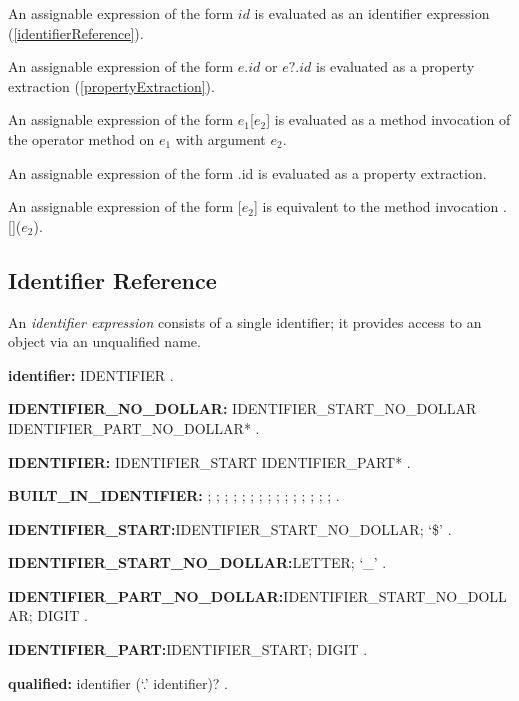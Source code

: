 \documentclass{article}
\newcommand{\code}[1]{{\sf #1}}
\begin{document}
\LMHash{}
An assignable expression of the form $id$ is evaluated as an identifier expression (\ref{identifierReference}).


\LMHash{}
An assignable expression of the form $e.id$ or $e?.id$ is evaluated as a property extraction  (\ref{propertyExtraction}).

\LMHash{}
An assignable expression of the form \code{$e_1$[$e_2$]} is evaluated as a method invocation of the operator method \code{[]} on $e_1$ with argument $e_2$.

\LMHash{}
An assignable expression of the form \code{\SUPER{}.id}  is evaluated as a property extraction.

\LMHash{}
An assignable expression of the form \code{\SUPER{}[$e_2$]} is equivalent to the method invocation  \code{\SUPER{}.[]($e_2$)}.

\subsection{ Identifier Reference}

\LMHash{}
An {\em identifier expression} consists of a single identifier; it provides access to an object via an unqualified name.

\begin{grammar}
{\bf identifier:}
     IDENTIFIER
     .
     
         
 {\bf IDENTIFIER\_NO\_DOLLAR:}
      IDENTIFIER\_START\_NO\_DOLLAR IDENTIFIER\_PART\_NO\_DOLLAR*
    .

{\bf IDENTIFIER:}
      IDENTIFIER\_START IDENTIFIER\_PART*
    .

{\bf BUILT\_IN\_IDENTIFIER:} \ABSTRACT{};
     \AS{};
     \DEFERRED{};
     \DYNAMIC{};
     \EXPORT{};
     \EXTERNAL{};
     \FACTORY{};
     \GET{};
     \IMPLEMENTS{};
     \IMPORT{};
     \LIBRARY{};
     \OPERATOR{};
     \PART{};
      \SET{};
      \STATIC{};
     \TYPEDEF{}
    .

 {\bf IDENTIFIER\_START:}IDENTIFIER\_START\_NO\_DOLLAR;
      `\$'
    .

{\bf IDENTIFIER\_START\_NO\_DOLLAR:}LETTER;
      `\_'
    .

{\bf  IDENTIFIER\_PART\_NO\_DOLLAR:}IDENTIFIER\_START\_NO\_DOLLAR;
      DIGIT
    .


{\bf IDENTIFIER\_PART:}IDENTIFIER\_START;
      DIGIT
    .



{\bf qualified:}
      identifier (`{\escapegrammar .}' identifier)?  
      . 
\end{grammar}
\end{document}
